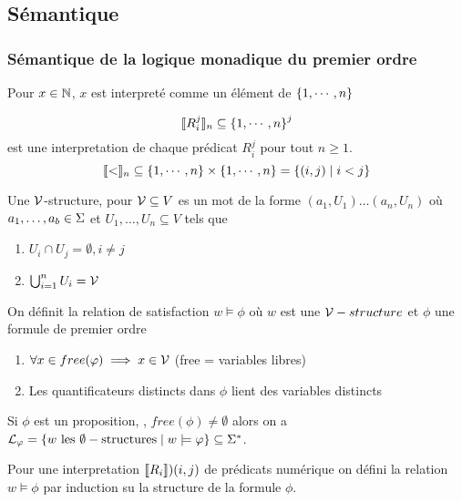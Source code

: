 \subsection{Sémantique}

\subsubsection{Sémantique de la logique monadique du premier ordre}

Pour $x \in \mathbb{N}$, $x$ est interpreté comme un élément de $\left\{1, \cdots, n\right\}$

$$ \llbracket R_i^j \rrbracket_n \subseteq \left\{1, \cdots, n\right\}^j$$
est une interpretation de chaque prédicat $R_i^j$ pour tout $n \geq 1$.
$$ \llbracket < \rrbracket_n \subseteq \left\{1, \cdots, n\right\} \times \left\{1, \cdots, n\right\} = \left\{(i,j) \mid i<j\right\}$$


\begin{definition}
	Une $\mathcal{V}$-structure, pour $\mathcal{V} \subseteq V$ es un mot de la forme $(a_1, U_1) \ldots (a_n, U_n)$ où $a_1, \ldots, a_b \in \Sigma$ et
	$U_1, \ldots, U_n \subseteq V$ tels que

	\begin{enumerate}
		\item $U_i \cap U_j = \emptyset, i \neq j$
		\item  $\bigcup_{i=1}^n U_i = \mathcal{V}$
	\end{enumerate}
\end{definition}

\begin{definition}
	On définit la relation de satisfaction $w \models \phi$ où $w$ est une $\mathcal{V}-structure$ et $\phi$ une formule de premier ordre \tq
	\begin{enumerate}
		\item $\forall x \in free(\varphi) \implies x \in \mathcal{V}$ (free = variables libres)
		\item Les quantificateurs distincts dans $\phi$ lient des variables distincts
	\end{enumerate}
\end{definition}

Si $\phi$ est un proposition, \cad, $free(\phi) \neq \emptyset$ alors on a $\mathcal{L}_{\varphi} = \left\{w \text { les } \emptyset-\text{structures} \mid w \models \varphi\right\} \subseteq \Sigma^{*}$.


Pour une interpretation $\llbracket R_i \rrbracket){(i,j)}$ de prédicats numérique on défini la relation $w \models \phi$ par induction su la structure de la formule $\phi$.

